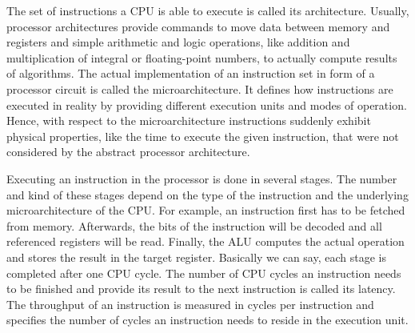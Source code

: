 \documentclass{stdlocal}
\begin{document}
    The set of instructions a CPU is able to execute is called its architecture.
    Usually, processor architectures provide commands to move data between memory and registers and simple arithmetic and logic operations, like addition and multiplication of integral or floating-point numbers, to actually compute results of algorithms.
    The actual implementation of an instruction set in form of a processor circuit is called the microarchitecture.
    It defines how instructions are executed in reality by providing different execution units and modes of operation.
    Hence, with respect to the microarchitecture instructions suddenly exhibit physical properties, like the time to execute the given instruction, that were not considered by the abstract processor architecture.
    \autocite{hennessy2019,patterson2014}

    Executing an instruction in the processor is done in several stages.
    The number and kind of these stages depend on the type of the instruction and the underlying microarchitecture of the CPU.
    For example, an instruction first has to be fetched from memory.
    Afterwards, the bits of the instruction will be decoded and all referenced registers will be read.
    Finally, the ALU computes the actual operation and stores the result in the target register.
    Basically we can say, each stage is completed after one CPU cycle.
    The number of CPU cycles an instruction needs to be finished and provide its result to the next instruction is called its latency.
    The throughput of an instruction is measured in cycles per instruction and specifies the number of cycles an instruction needs to reside in the execution unit.
    \autocite{intel-latency-throughput}
\end{document}
